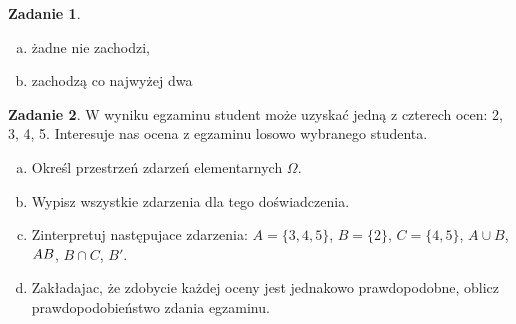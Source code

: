 \documentclass[11pt]{article}
\theoremstyle{definition}
\newtheorem{zadanie}{Zadanie}
\numberwithin{zadanie}{section}
\begin{document}
\begin{zadanie}
\begin{enumerate}[a)]
        \item żadne nie zachodzi,


        \item zachodzą co najwyżej dwa

    \end{enumerate}
\end{zadanie}

\begin{zadanie}
    W wyniku egzaminu student może uzyskać jedną z czterech ocen: 2, 3, 4, 5. Interesuje nas ocena z egzaminu losowo wybranego studenta.
    \begin{enumerate}[a)]
        \item Określ przestrzeń zdarzeń elementarnych $\Omega$.
        \item Wypisz wszystkie zdarzenia dla tego doświadczenia.
        \item Zinterpretuj następujace zdarzenia: $A = \{3, 4, 5\}$, $B = \{2\}$, $C = \{4, 5\}$, $A \cup B$, $A \\ B$, $B \cap C$, $B'$.
        \item Zakładajac, że zdobycie każdej oceny jest jednakowo prawdopodobne, oblicz prawdopodobieństwo zdania egzaminu.
    \end{enumerate}
\end{zadanie}
\end{document}
